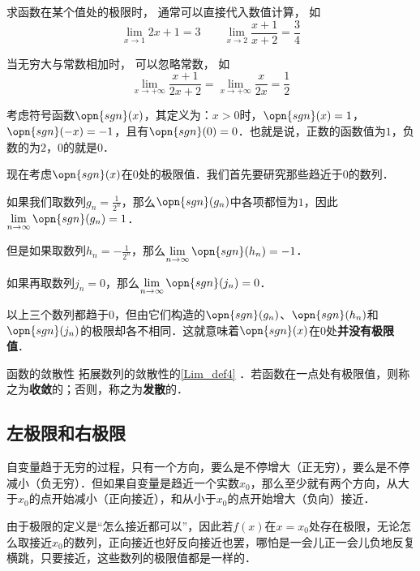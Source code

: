 \begin{example}{}
求函数在某个值处的极限时， 通常可以直接代入数值计算， 如
\begin{equation}
\lim_{x\to 1} 2x + 1 = 3 \qquad \lim_{x\to 2}\frac{x + 1}{x + 2} = \frac34
\end{equation}

当无穷大与常数相加时， 可以忽略常数， 如
\begin{equation}
\lim_{x\to +\infty} \frac{x + 1}{2x + 2} = \lim_{x\to +\infty} \frac{x}{2x} = \frac12
\end{equation}
\end{example}

\begin{example}{}\label{Lim_ex2}
考虑符号函数$\opn{sgn}(x)$，其定义为：$x>0$时，$\opn{sgn}(x)=1$，$\opn{sgn}(-x)=-1$，且有$\opn{sgn}(0)=0$．也就是说，正数的函数值为$1$，负数的为$2$，$0$的就是$0$．

现在考虑$\opn{sgn}(x)$在$0$处的极限值．我们首先要研究那些趋近于$0$的数列．

如果我们取数列$g_n=\frac{1}{2^n}$，那么$\opn{sgn}(g_n)$中各项都恒为$1$，因此$\lim\limits_{n\to\infty}\opn{sgn}(g_n)=1$．

但是如果取数列$h_n=-\frac{1}{2^n}$，那么$\lim\limits_{n\to\infty}\opn{sgn}(h_n)=-1$．

如果再取数列$j_n=0$，那么$\lim\limits_{n\to\infty}\opn{sgn}(j_n)=0$．

以上三个数列都趋于$0$，但由它们构造的$\opn{sgn}(g_n)$、$\opn{sgn}(h_n)$和$\opn{sgn}(j_n)$的极限却各不相同．这就意味着$\opn{sgn}(x)$在$0$处\textbf{并没有极限值}．
\end{example}

\begin{definition}{函数的敛散性}
拓展数列的敛散性的\autoref{Lim_def4} ．若函数在一点处有极限值，则称之为\textbf{收敛}的；否则，称之为\textbf{发散}的．
\end{definition}

\subsection{左极限和右极限}

自变量趋于无穷的过程，只有一个方向，要么是不停增大（正无穷），要么是不停减小（负无穷）．但如果自变量是趋近一个实数$x_0$，那么至少就有两个方向，从大于$x_0$的点开始减小（正向接近），和从小于$x_0$的点开始增大（负向）接近．

由于极限的定义是“怎么接近都可以”，因此若$f(x)$在$x=x_0$处存在极限，无论怎么取接近$x_0$的数列，正向接近也好反向接近也罢，哪怕是一会儿正一会儿负地反复横跳，只要接近，这些数列的极限值都是一样的．

